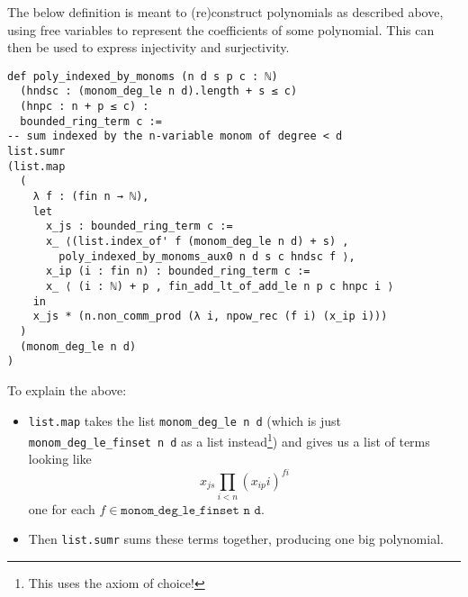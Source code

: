The below definition is meant to (re)construct polynomials as described above,
using free variables to represent the coefficients of some polynomial.
This can then be used to express injectivity and surjectivity.

\begin{lstlisting}
def poly_indexed_by_monoms (n d s p c : ℕ)
  (hndsc : (monom_deg_le n d).length + s ≤ c)
  (hnpc : n + p ≤ c) :
  bounded_ring_term c :=
-- sum indexed by the n-variable monom of degree < d
list.sumr
(list.map
  (
    λ f : (fin n → ℕ),
    let
      x_js : bounded_ring_term c :=
      x_ ⟨(list.index_of' f (monom_deg_le n d) + s) ,
        poly_indexed_by_monoms_aux0 n d s c hndsc f ⟩,
      x_ip (i : fin n) : bounded_ring_term c :=
      x_ ⟨ (i : ℕ) + p , fin_add_lt_of_add_le n p c hnpc i ⟩
    in
    x_js * (n.non_comm_prod (λ i, npow_rec (f i) (x_ip i)))
  )
  (monom_deg_le n d)
) \end{lstlisting}

To explain the above:
\begin{itemize}
  \item \texttt{list.map} takes the list \texttt{monom\_deg\_le n d}
        (which is just \texttt{monom\_deg\_le\_finset n d} as a list instead\footnote{
          This uses the axiom of choice!})
        and gives us a list of terms looking like
        \[x_{js} \prod_{i < n} (x_{ip} i) ^{f i}\] one for each
        $f \in \texttt{monom\_deg\_le\_finset n d}$.
  \item Then \texttt{list.sumr} sums these terms together, producing one big polynomial.
\end{itemize}
